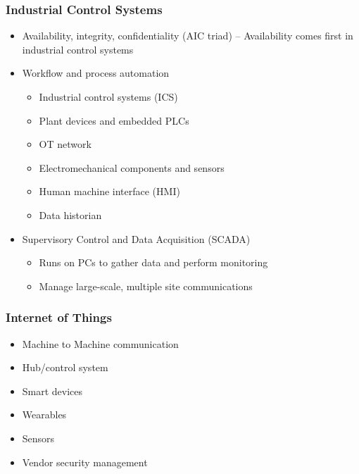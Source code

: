 		\subsubsection {Industrial Control Systems}
			\begin{itemize}
				\item Availability, integrity, confidentiality (AIC triad)
					-- Availability comes first in industrial control systems
				\item Workflow and process automation
					\begin{itemize}
						\item Industrial control systems (ICS)
						\item Plant devices and embedded PLCs
						\item OT network
						\item Electromechanical components and sensors
						\item Human machine interface (HMI)
						\item Data historian
					\end{itemize}
				\item Supervisory Control and Data Acquisition (SCADA)
					\begin{itemize}
						\item Runs on PCs to gather data and perform monitoring
						\item Manage large-scale, multiple site communications
					\end{itemize}
			\end{itemize}
		\subsubsection {Internet of Things}
			\begin{itemize}
				\item Machine to Machine communication
				\item Hub/control system
				\item Smart devices
				\item Wearables
				\item Sensors
				\item Vendor security management
			\end{itemize}
